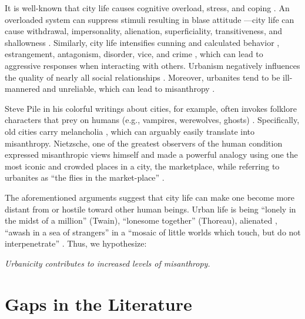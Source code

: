 \documentclass[11pt, letterpaper]{article}
\begin{document}
\begin{spacing}{1.4}
It is well-known that city life causes cognitive overload, stress, and coping \citep{simmel03, milgram70,lederbogen11}. An overloaded system can suppress stimuli resulting in blase attitude
\citep{simmel03}---city life can cause withdrawal, impersonality, alienation, superficiality, transitiveness, and shallowness \citep{wirth38}. Similarly, city life intensifies cunning and calculated behavior \citep{tonnies57}, estrangement, antagonism, disorder, vice, and crime
\citep{milgram70,park15,park84,bettencourt10b}, which can lead to aggressive
responses when interacting with others.
%
Urbanism negatively influences the quality of nearly all social relationships \citep{wilson85}. Moreover, urbanites tend to be ill-mannered and unreliable, which can lead to misanthropy \citep[e.g.,][]{aokCityBook15,aok-sizeFetish17}.

Steve Pile in his colorful writings about cities, for example, often invokes
folklore characters that prey on humans (e.g., vampires, werewolves, ghosts)  \citep{pile05,pile05B,pile99}.
%
Specifically, old cities carry melancholia \citep{pile05B}, which can arguably easily translate into misanthropy.
%
Nietzsche, one of the greatest observers of the human condition expressed misanthropic views
himself \citep[e.g.,][]{avramenko2004zarathustra} %
 and made a powerful analogy using one the most iconic and crowded places in a city, the marketplace, while referring to urbanites as ``the flies in the market-place'' \citep{nietzsche05}. 

The aforementioned arguments suggest that city life can make one become more distant from or hostile toward other human beings. 
Urban life is being ``lonely in the midst of a million'' (Twain), ``lonesome together''
(Thoreau), alienated \citep{wirth38,nettler1957measure}, ``awash in a sea of strangers''
\citep[Merry cited in][p. 99]{wilson85} in a ``mosaic of little worlds which touch, but do not interpenetrate'' \citep[][p. 40]{park84}. Thus, we hypothesize:
 
{\indent\hspace{1in}\textit{Urbanicity contributes to increased levels of misanthropy.}}

\section*{Gaps in the Literature} 


\end{spacing}
\end{document}
